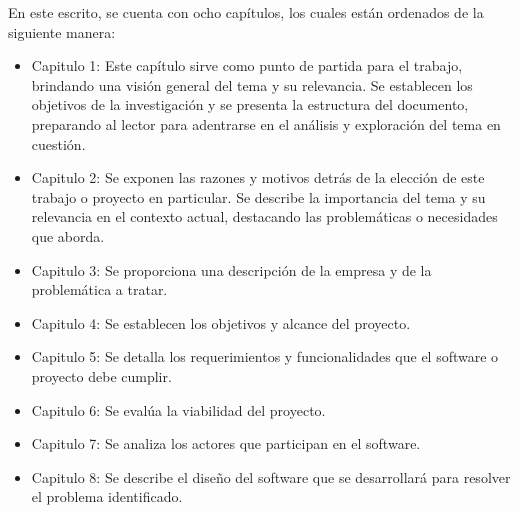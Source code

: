 En este escrito, se cuenta con ocho capítulos, los cuales están ordenados de la siguiente manera:
\begin{itemize}
    \item Capitulo 1: Este capítulo sirve como punto de partida para el trabajo, brindando una visión general del tema y su relevancia. Se establecen los objetivos de la investigación y se presenta la estructura del documento, preparando al lector para adentrarse en el análisis y exploración del tema en cuestión.
    \item Capitulo 2: Se exponen las razones y motivos detrás de la elección de este trabajo o proyecto en particular. Se describe la importancia del tema y su relevancia en el contexto actual, destacando las problemáticas o necesidades que aborda.
    \item Capitulo 3: Se proporciona una descripción de la empresa y de la problemática a tratar.
    \item Capitulo 4: Se establecen los objetivos y alcance del proyecto.
    \item Capitulo 5: Se detalla los requerimientos y funcionalidades que el software o proyecto debe cumplir.
    \item Capitulo 6: Se evalúa la viabilidad del proyecto.
    \item Capitulo 7: Se analiza los actores que participan en el software.
    \item Capitulo 8: Se describe el diseño del software que se desarrollará para resolver el problema identificado.
\end{itemize}